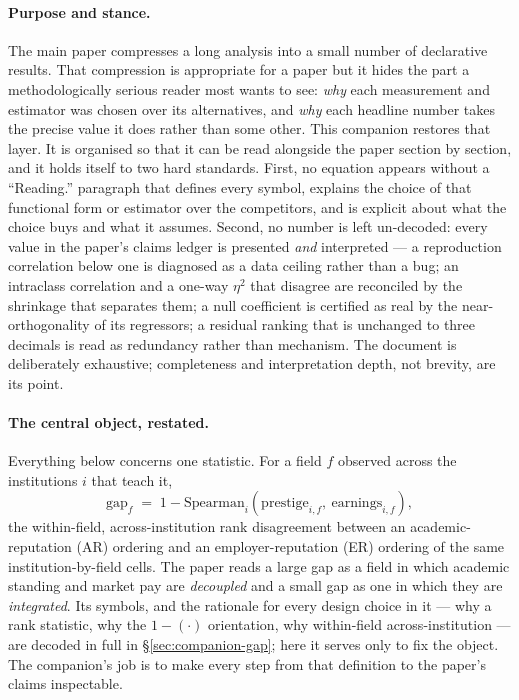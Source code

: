 \documentclass[11pt]{article}
\begin{document}
\paragraph{Purpose and stance.} The main paper compresses a long analysis into a small number of declarative
results. That compression is appropriate for a paper but it hides the part a methodologically serious reader
most wants to see: \emph{why} each measurement and estimator was chosen over its alternatives, and \emph{why}
each headline number takes the precise value it does rather than some other. This companion restores that
layer. It is organised so that it can be read alongside the paper section by section, and it holds itself to
two hard standards. First, no equation appears without a ``Reading.'' paragraph that defines every symbol,
explains the choice of that functional form or estimator over the competitors, and is explicit about what the
choice buys and what it assumes. Second, no number is left un-decoded: every value in the paper's claims ledger
is presented \emph{and} interpreted --- a reproduction correlation below one is diagnosed as a data ceiling
rather than a bug; an intraclass correlation and a one-way $\eta^2$ that disagree are reconciled by the
shrinkage that separates them; a null coefficient is certified as real by the near-orthogonality of its
regressors; a residual ranking that is unchanged to three decimals is read as redundancy rather than mechanism.
The document is deliberately exhaustive; completeness and interpretation depth, not brevity, are its point.

\paragraph{The central object, restated.} Everything below concerns one statistic. For a field $f$ observed
across the institutions $i$ that teach it,
\[
\mathrm{gap}_f \;=\; 1 - \mathrm{Spearman}_i\!\left(\mathrm{prestige}_{i,f},\ \mathrm{earnings}_{i,f}\right),
\]
the within-field, across-institution rank disagreement between an academic-reputation (AR) ordering and an
employer-reputation (ER) ordering of the same institution-by-field cells. The paper reads a large gap as a
field in which academic standing and market pay are \emph{decoupled} and a small gap as one in which they are
\emph{integrated}. Its symbols, and the rationale for every design choice in it --- why a rank statistic, why the $1-(\cdot)$ orientation, why within-field across-institution --- are decoded in full in \S\ref{sec:companion-gap}; here it serves only to fix the object. The companion's job is to make every step from that definition to the paper's claims
inspectable.
\end{document}

